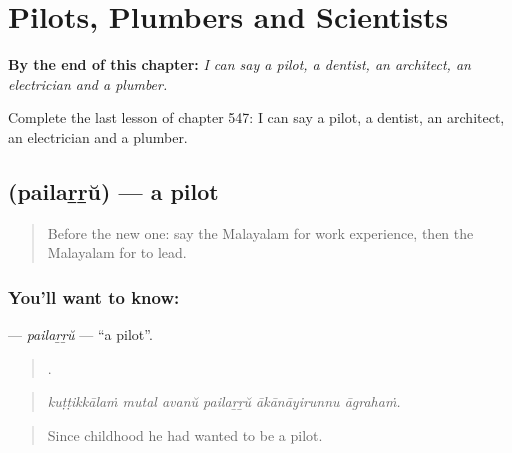 
\chapter{Pilots, Plumbers and Scientists}
\label{ch:ml-pilots-plumbers-and-scientists}

\begin{chapteropening}
\textbf{By the end of this chapter:} \emph{I can say a pilot, a dentist, an architect, an electrician and a plumber.}

Complete the last lesson of chapter 547: I can say a pilot, a dentist, an architect, an electrician and a plumber.
\end{chapteropening}

\section[\texorpdfstring{\ml{പൈലറ്റ്} (pailaṟṟŭ)}{പൈലറ്റ് (pailaṟṟŭ)}]{ (pailaṟṟŭ) — a pilot}

\label{lesson:ML-C547-pailarru}



\begin{quote}
Before the new one: say the Malayalam for work experience, then the Malayalam for to lead.
\end{quote}

\subsection*{You'll want to know: }
\textbf{} — \emph{pailaṟṟŭ} — \textquotedblleft{}a pilot\textquotedblright{}.

\begin{quote}
     .
\end{quote}

\begin{quote}
\emph{kuṭṭikkālaṁ mutal avanŭ pailaṟṟŭ ākānāyirunnu āgrahaṁ.}
\end{quote}

\begin{quote}
Since childhood he had wanted to be a pilot.
\end{quote}

